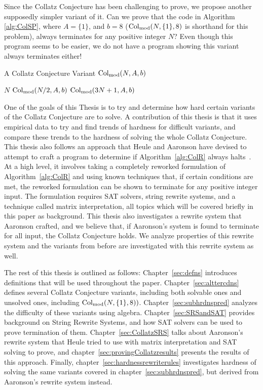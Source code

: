 Since the Collatz Conjecture has been challenging to prove, we propose another supposedly simpler variant of it. Can we prove that the code in Algorithm \ref{alg:ColSP}, where $A = \{1\}$, and $b = 8$ ($\mathrm{Col}_{\text{mod}}(N,\{1\},8)$ is shorthand for this problem), always terminates for any positive integer $N$? Even though this program seems to be easier, we do not have a program showing this variant always terminates either! \par
\begin{algorithm} 
\caption{A Collatz Conjecture Variant $\mathrm{Col}_{\text{mod}}(N,A,b)$}
\label{alg:ColSP} 
\begin{algorithmic}[1]
     \Return $N$
    \EndIf
     \Return $\mathrm{Col}_{\text{mod}}(N/2,A,b)$
    \EndIf
    \State \Return $\mathrm{Col}_{\text{mod}}(3N+1,A,b)$ 
\end{algorithmic}
\end{algorithm}
One of the goals of this Thesis is to try and determine how hard certain variants of the Collatz Conjecture are to solve. A contribution of this thesis is that it uses empirical data to try and find trends of hardness for difficult variants, and compare these trends to the hardness of solving the whole Collatz Conjecture. This thesis also follows an approach that Heule and Aaronson have devised to attempt to craft a program to determine if Algorithm~\ref{alg:ColR} always halts~\cite{HeuleAaronson}. At a high level, it involves taking a completely reworked formulation of Algorithm~\ref{alg:ColR} and using known techniques that, if certain conditions are met, the reworked formulation can be shown to terminate for any positive integer input. The formulation requires SAT solvers, string rewrite systems, and a technique called matrix interpretation, all topics which will be covered briefly in this paper as background. This thesis also investigates a rewrite system that Aaronson crafted, and we believe that, if Aaronson's system is found to terminate for all input, the Collatz Conjecture holds. We analyze properties of this rewrite system and the variants from before are investigated with this rewrite system as well.\par
The rest of this thesis is outlined as follows: Chapter~\ref{sec:defns} introduces definitions that will be used throughout the paper. Chapter~\ref{sec:alttercdns} defines several Collatz Conjecture variants, including both solvable ones and unsolved ones, including $\mathrm{Col}_{\text{mod}}(N,\{1\},8))$. Chapter~\ref{sec:subhrdnspred} analyzes the difficulty of these variants using algebra. Chapter~\ref{sec:SRSandSAT} provides background on String Rewrite Systems, and how SAT solvers can be used to prove termination of them. Chapter~\ref{sec:CollatzSRS} talks about Aaronson's rewrite system that Heule tried to use with matrix interpretation and SAT solving to prove, and chapter~\ref{sec:provingCollatzresults} presents the results of this approach. Finally, chapter~\ref{sec:hardnessrewriterules} investigates hardness of solving the same variants covered in chapter~\ref{sec:subhrdnspred}, but derived from Aaronson's rewrite system instead.
